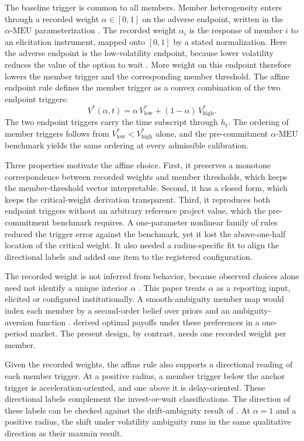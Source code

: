 \documentclass[5p,times,authoryear]{elsarticle}
\theoremstyle{plain}
\newcommand{\Vlow}{V^{*}_{\mathrm{low}}}
\newcommand{\Vhigh}{V^{*}_{\mathrm{high}}}
\newcommand{\aMEU}{\alpha\text{-MEU}}
\begin{document}
The baseline trigger is common to all members. Member heterogeneity enters through a recorded weight $\alpha\in[0,1]$ on the adverse endpoint, written in the $\aMEU$ parameterization \citep{Ghirardato2004}. The recorded weight $\alpha_i$ is the response of member $i$ to an elicitation instrument, mapped onto $[0,1]$ by a stated normalization. Here the adverse endpoint is the low-volatility endpoint, because lower volatility reduces the value of the option to wait \citep{DixitPindyck1994}. More weight on this endpoint therefore lowers the member trigger and the corresponding member threshold. The affine endpoint rule defines the member trigger as a convex combination of the two endpoint triggers:
\begin{equation}
V^{*}(\alpha,t)=\alpha\,\Vlow+(1-\alpha)\,\Vhigh.
\label{eq:affine}
\end{equation}
The two endpoint triggers carry the time subscript through $h_t$. The ordering of member triggers follows from $\Vlow<\Vhigh$ alone, and the pre-commitment $\aMEU$ benchmark yields the same ordering at every admissible calibration.

Three properties motivate the affine choice. First, it preserves a monotone correspondence between recorded weights and member thresholds, which keeps the member-threshold vector interpretable. Second, it has a closed form, which keeps the critical-weight derivation transparent. Third, it reproduces both endpoint triggers without an arbitrary reference project value, which the pre-commitment benchmark requires. A one-parameter nonlinear family of rules reduced the trigger error against the benchmark, yet it lost the above-one-half location of the critical weight. It also needed a radius-specific fit to align the directional labels and added one item to the registered configuration.

The recorded weight is not inferred from behavior, because observed choices alone need not identify a unique interior $\alpha$ \citep{Eichberger2011}. This paper treats $\alpha$ as a reporting input, elicited or configured institutionally. A smooth-ambiguity member map would index each member by a second-order belief over priors and an ambiguity-aversion function \citep{Klibanoff2005}. \citet{ChenA2025} derived optimal payoffs under these preferences in a one-period market. The present design, by contrast, needs one recorded weight per member.

Given the recorded weights, the affine rule also supports a directional reading of each member trigger. At a positive radius, a member trigger below the anchor trigger is acceleration-oriented, and one above it is delay-oriented. These directional labels complement the invest-or-wait classifications. The direction of these labels can be checked against the drift-ambiguity result of \citet{NishimuraOzaki2007}. At $\alpha=1$ and a positive radius, the shift under volatility ambiguity runs in the same qualitative direction as their maxmin result.
\end{document}
